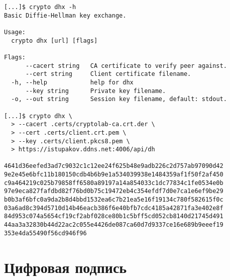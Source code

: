 \documentclass[12pt, a4paper]{article}
\begin{document}
\begin{verbatim}
[...]$ crypto dhx -h
Basic Diffie-Hellman key exchange.

Usage:
  crypto dhx [url] [flags]

Flags:
      --cacert string   CA certificate to verify peer against.
      --cert string     Client certificate filename.
  -h, --help            help for dhx
      --key string      Private key filename.
  -o, --out string      Session key filename, default: stdout.

[...]$ crypto dhx \
  > --cacert .certs/cryptolab-ca.crt.der \
  > --cert .certs/client.crt.pem \
  > --key .certs/client.pkcs8.pem \
  > https://istupakov.ddns.net:4006/api/dh

4641d36eefed3ad7c9032c1c12ee24f625b48e9adb226c2d757ab97090d42
9e2e45e6bfc11b180150cdb4b6b9e1a534039938e1484359af1f50f2af450
c9a464219c025b79858ff6580a89197a14a854033c1dc77834c1fe0534e0b
97e9eca827fafdbd82f76bd0b75c19472eb4c354efdf7d0e7ca1e6ef9be29
b0b3af6bfc0a9da2b8d4bbd1532ea6c7b21ea5e16f19134c780f582615f0c
03a6ad8c394d5710d14b46eacb386f6e40bfb7cdc4185a42871fa3e402e8f
84d953c074a5654cf19cf2abf028ce80b1c5bff5cd052cb8140d21745d491
44aa3a32830b44d22ac2c055e4426de087ca60d7d9337ce16e689b9eeef19
353e4da55490f56cd946f96
\end{verbatim}

\section{Цифровая подпись}
\end{document}
